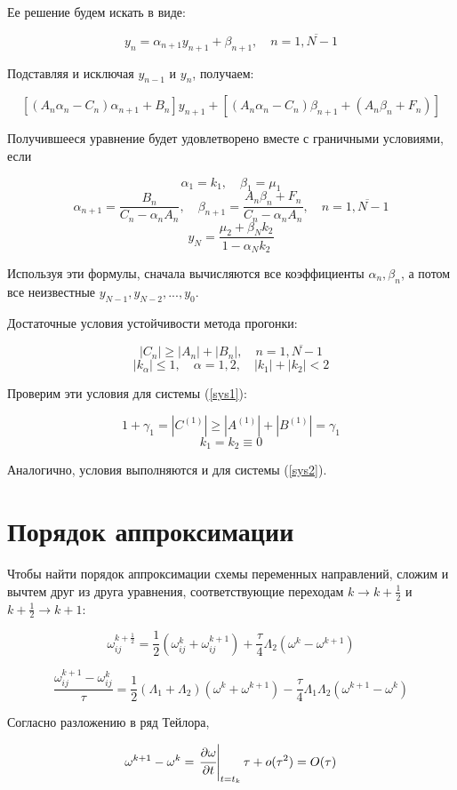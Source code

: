 \documentclass[12pt]{article}
\def\dd#1#2{\cfrac{\partial#1}{\partial#2}}
\begin{document}
			Ее решение будем искать в виде:
			
			$$y_n  = \alpha_{n+1} y_{n+1} + \beta_{n+1}, \quad n = \overline{1, N-1}$$
			
			Подставляя и исключая $y_{n-1}$ и $y_n$, получаем:
			
			$$[(A_n \alpha_n - C_n)\alpha_{n+1} + B_n]y_{n+1} + [(A_n \alpha_n - C_n)\beta_{n+1} + (A_n \beta_n + F_n)]$$
			
			Получившееся уравнение будет удовлетворено вместе с граничными условиями, если
			
			$$\alpha_1 = k_1, \quad \beta_1 = \mu_1$$
			$$\alpha_{n+1} = \frac{B_n}{C_n - \alpha_n A_n}, \quad \beta_{n+1} = \frac{A_n \beta_n + F_n}{C_n - \alpha_n A_n}, \quad n = \overline{1, N-1}$$
			$$y_N = \frac{\mu_2 + \beta_N k_2}{1 - \alpha_N k_2}$$
			
			Используя эти формулы, сначала вычисляются все коэффициенты $\alpha_n, \beta_n$, а потом все неизвестные $y_{N-1}, y_{N-2}, ..., y_0$.
			
			Достаточные условия устойчивости метода прогонки:
			
			$$|C_n| \ge |A_n| + |B_n|, \quad n = \overline{1, N-1}$$
			$$|k_\alpha| \le 1, \quad \alpha = 1, 2, \quad |k_1| + |k_2| < 2$$
			
			Проверим эти условия для системы (\ref{sys1}):
			
			$$1 + \gamma_1 = |C^{(1)}| \ge |A^{(1)}| + |B^{(1)}| = \gamma_1$$
			$$k_1 = k_2 \equiv 0$$
			
			Аналогично, условия выполняются и для системы (\ref{sys2}).
			
	\section{Порядок аппроксимации}
		Чтобы найти порядок аппроксимации схемы переменных направлений, сложим и вычтем друг из друга уравнения, соответствующие переходам $k \rightarrow k+\frac{1}{2}$ и $k + \frac{1}{2} \rightarrow k + 1$:
		
		$$\omega^{k+\frac{1}{2}}_{ij} = \frac{1}{2}(\omega^k_{ij} + \omega^{k+1}_{ij}) + \frac{\tau}{4}\Lambda_2 (\omega^k - \omega^{k+1})$$
		
		$$\frac{\omega^{k+1}_{ij} - \omega^k_{ij}}{\tau} = \frac{1}{2}(\Lambda_1 + \Lambda_2)(\omega^k + \omega^{k+1}) - \frac{\tau}{4}\Lambda_1 \Lambda_2 (\omega^{k+1} - \omega^k)$$
		
		Согласно разложению в ряд Тейлора,
		
		$$\omega^{k+1} - \omega^k =\left. \dd{\omega}t \right|_{t=t_k} \tau + o(\tau^2) = O(\tau)$$
		
\end{document}
